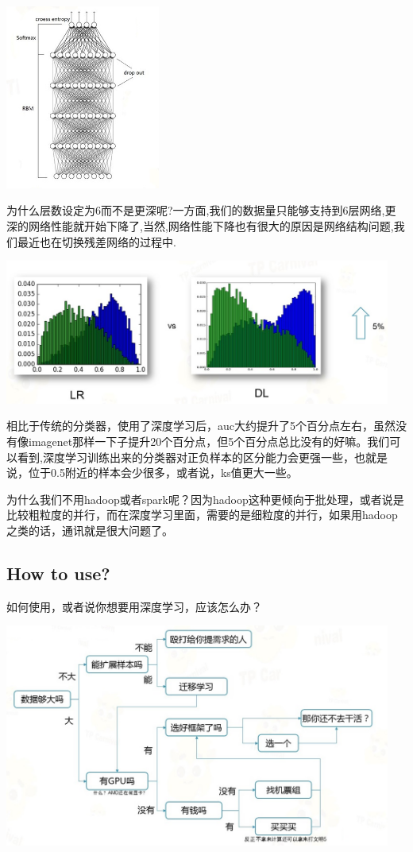 \documentclass{article}
\begin{document}
\begin{center}
\includegraphics[width=2in]{image/image30.jpg}
\end{center}

为什么层数设定为6而不是更深呢?一方面,我们的数据量只能够支持到6层网络,更深的网络性能就开始下降了,当然,网络性能下降也有很大的原因是网络结构问题,我们最近也在切换残差网络的过程中.

\begin{center}
\includegraphics[width=5in]{image/image31.jpg}
\end{center}

相比于传统的分类器，使用了深度学习后，auc大约提升了5个百分点左右，虽然没有像imagenet那样一下子提升20个百分点，但5个百分点总比没有的好嘛。我们可以看到,深度学习训练出来的分类器对正负样本的区分能力会更强一些，也就是说，位于0.5附近的样本会少很多，或者说，ks值更大一些。

为什么我们不用hadoop或者spark呢？因为hadoop这种更倾向于批处理，或者说是比较粗粒度的并行，而在深度学习里面，需要的是细粒度的并行，如果用hadoop之类的话，通讯就是很大问题了。

\subsection{How to use?}
如何使用，或者说你想要用深度学习，应该怎么办？

\begin{center}
\includegraphics[width=5in]{image/image32.jpg}
\end{center}
\end{document}
